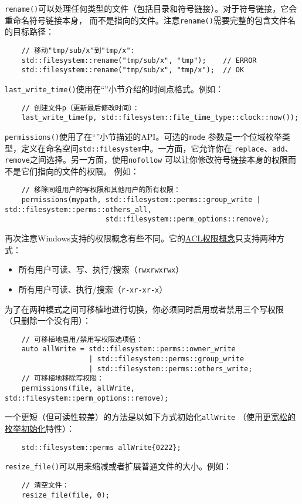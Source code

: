 \texttt{rename()}可以处理任何类型的文件（包括目录和符号链接）。对于符号链接，它会重命名符号链接本身，
而不是指向的文件。注意\texttt{rename()}需要完整的包含文件名的目标路径：
\begin{lstlisting}
    // 移动"tmp/sub/x"到"tmp/x":
    std::filesystem::rename("tmp/sub/x", "tmp");    // ERROR
    std::filesystem::rename("tmp/sub/x", "tmp/x");  // OK
\end{lstlisting}

\texttt{last\_write\_time()}使用在“”小节介绍的时间点格式。例如：
\begin{lstlisting}
    // 创建文件p（更新最后修改时间）：
    last_write_time(p, std::filesystem::file_time_type::clock::now());
\end{lstlisting}

\texttt{permissions()}使用了在“”小节描述的API。可选的\texttt{mode}
参数是一个位域枚举类型，定义在命名空间\texttt{std::filesystem}中。一方面，它允许你在
\texttt{replace}、\texttt{add}、\texttt{remove}之间选择。另一方面，使用\texttt{nofollow}
可以让你修改符号链接本身的权限而不是它们指向的文件的权限。
例如：
\begin{lstlisting}
    // 移除同组用户的写权限和其他用户的所有权限：
    permissions(mypath, std::filesystem::perms::group_write | std::filesystem::perms::others_all,
                        std::filesystem::perm_options::remove);
\end{lstlisting}
再次注意Windows支持的权限概念有些不同。它的\hyperref[ACL]{ACL权限概念}只支持两种方式：\label{可移植的修改权限}
\begin{itemize}
    \item 所有用户可读、写、执行/搜索（\texttt{rwxrwxrwx}）
    \item 所有用户可读、执行/搜索（\texttt{r-xr-xr-x}）
\end{itemize}
为了在两种模式之间可移植地进行切换，你必须同时启用或者禁用三个写权限
（只删除一个没有用）：
\begin{lstlisting}
    // 可移植地启用/禁用写权限选项值：
    auto allWrite = std::filesystem::perms::owner_write
                    | std::filesystem::perms::group_write
                    | std::filesystem::perms::others_write;
    // 可移植地移除写权限：
    permissions(file, allWrite, std::filesystem::perm_options::remove);
\end{lstlisting}
一个更短（但可读性较差）的方法是以如下方式初始化\texttt{allWrite}
（使用\hyperref[ch8.3]{更宽松的枚举初始化}特性）：
\begin{lstlisting}
    std::filesystem::perms allWrite{0222};
\end{lstlisting}
\texttt{resize\_file()}可以用来缩减或者扩展普通文件的大小。例如：
\begin{lstlisting}
    // 清空文件：
    resize_file(file, 0);
\end{lstlisting}

